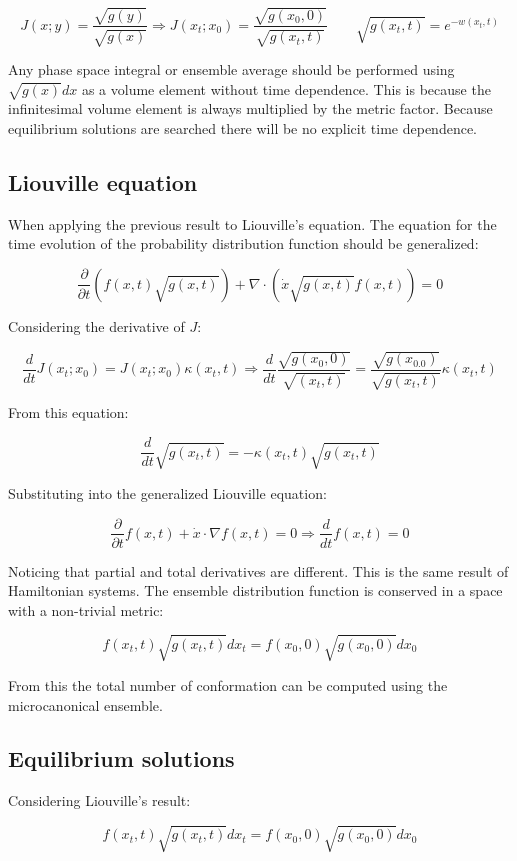 	$$J(x; y) = \frac{\sqrt{g(y)}}{\sqrt{g(x)}}\Rightarrow J(x_t;x_0) = \frac{\sqrt{g(x_0, 0)}}{\sqrt{g(x_t, t)}}\qquad \sqrt{g(x_t, t)} = e^{-w(x_t, t)}$$

	Any phase space integral or ensemble average should be performed using $\sqrt{g(x)}dx$ as a volume element without time dependence.
	This is because the infinitesimal volume element is always multiplied by the metric factor.
	Because equilibrium solutions are searched there will be no explicit time dependence.

	\subsection{Liouville equation}
	When applying the previous result to Liouville's equation.
	The equation for the time evolution of the probability distribution function should be generalized:

	$$\frac{\partial}{\partial t}(f(x, t)\sqrt{g(x, t)})+\nabla\cdot(\dot{x}\sqrt{g(x, t)}f(x,t)) = 0$$

	Considering the derivative of $J$:

	$$\frac{d}{dt}J(x_t;x_0) = J(x_t;x_0)\kappa(x_t, t)\Rightarrow \frac{d}{dt}\frac{\sqrt{g(x_0, 0)}}{\sqrt{(x_t,t)}} = \frac{\sqrt{g(x_0.0)}}{\sqrt{g(x_t,t)}}\kappa(x_t, t)$$

	From this equation:

	$$\frac{d}{dt}\sqrt{g(x_t, t)} = -\kappa(x_t, t) \sqrt{g(x_t,t)}$$

	Substituting into the generalized Liouville equation:

	$$\frac{\partial}{\partial t} f(x,t) + \dot{x}\cdot\nabla f(x,t) = 0\Rightarrow \frac{d}{dt}f(x,t) = 0$$

	Noticing that partial and total derivatives are different.
	This is the same result of Hamiltonian systems.
	The ensemble distribution function is conserved in a space with a non-trivial metric:

	$$f(x_t, t)\sqrt{g(x_t, t)}dx_t = f(x_0,0)\sqrt{g(x_0,0)}dx_0$$

	From this the total number of conformation can be computed using the microcanonical ensemble.

	\subsection{Equilibrium solutions}
	Considering Liouville's result:

	$$f(x_t, t)\sqrt{g(x_t, t)}dx_t = f(x_0, 0)\sqrt{g(x_0,0)}dx_0$$

